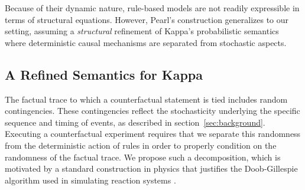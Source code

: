 Because of their dynamic nature, rule-based models are not readily
expressible in terms of structural equations. However, Pearl's
construction generalizes to our setting, assuming a \emph{structural}
refinement of Kappa's probabilistic semantics where deterministic
causal mechanisms are separated from stochastic aspects.

\subsection{A Refined Semantics for Kappa}
\label{subsec:semantics-refinement}

The factual trace to which a counterfactual statement is tied includes
random contingencies.  These contingencies reflect the stochasticity
underlying the specific sequence and timing of events, as described in
section~\ref{sec:background}.
Executing a counterfactual
experiment requires that we separate this randomness from the
deterministic action of rules in order to properly condition on 
the randomness of the factual trace. 
We propose such a decomposition,
which is motivated by a standard construction in physics that
justifies the Doob-Gillespie algorithm used in simulating reaction
systems \cite{gillespie1977exact}.



